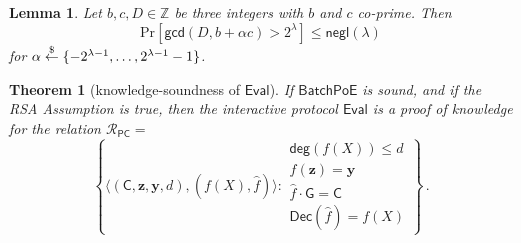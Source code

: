 \documentclass{article}
\theoremstyle{Definition}
\newtheorem{theorem}{Theorem}
\newtheorem{lemma}{Lemma}
\begin{document}
\begin{lemma} \label{lemma:gcd_distribution}
Let $b, c, D \in \mathbb{Z}$ be three integers with $b$ and $c$ co-prime. Then
$$ \mathrm{Pr}[\mathsf{gcd}(D, b + \alpha c) > 2^\lambda] \leq \mathsf{negl}(\lambda) $$
for $\alpha \overset{\$}{\gets} \{-2^{\lambda-1}, \ldots, 2^{\lambda - 1} - 1 \}$.
\end{lemma}

\begin{theorem}[knowledge-soundness of $\mathsf{Eval}$]
If $\mathsf{BatchPoE}$ is sound, and if the RSA Assumption is true, then the interactive protocol $\mathsf{Eval}$ is a proof of knowledge for the relation $\mathcal{R}_{\mathsf{PC}} =$
$$ \left\{ \langle (\mathsf{C}, \mathbf{z}, \mathbf{y}, d), (f(X), \hat{f})\rangle : \begin{array}{l}
\mathsf{deg}(f(X)) \leq d \\
f(\mathbf{z}) = \mathbf{y} \\
\hat{f} \cdot \mathsf{G} = \mathsf{C} \\
\mathsf{Dec}(\hat{f}) = f(X)
\end{array} \right\} \, .$$
\end{theorem}
\end{document}
